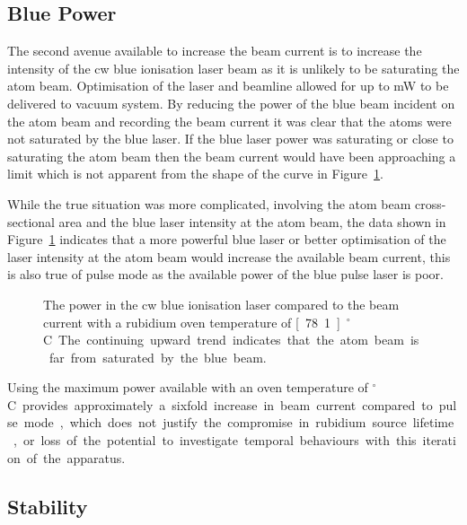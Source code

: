 \subsection{Blue Power}

The second avenue available to increase the beam current is to increase the intensity of the \gls{cw} blue ionisation laser beam as it is unlikely to be saturating the atom beam.
Optimisation of the laser and beamline allowed for up to \unit[280]{mW} to be delivered to vacuum system.
By reducing the power of the blue beam incident on the atom beam and recording the beam current it was clear that the atoms were not saturated by the blue laser.
If the blue laser power was saturating or close to saturating the atom beam then the beam current would have been approaching a limit which is not apparent from the shape of the curve in Figure~\ref{figure:blue_power}.

While the true situation was more complicated, involving the atom beam cross-sectional area and the blue laser intensity at the atom beam, the data shown in Figure~\ref{figure:blue_power} indicates that a more powerful blue laser or better optimisation of the laser intensity at the atom beam would increase the available beam current, this is also true of pulse mode as the available power of the blue pulse laser is poor.

\begin{figure}
    \center
    
    \caption[Beam current and ionisation laser power.]{The power in the \gls{cw} blue ionisation laser compared to the beam current with a rubidium oven temperature of \unit[78.1]{$^\circ$C}.
    The continuing upward trend indicates that the atom beam is far from saturated by the blue beam.}
    \label{figure:blue_power}
\end{figure}

Using the maximum power available with an oven temperature of \unit[200]{$^\circ$C} provides approximately a sixfold increase in beam current compared to pulse mode, which does not justify the compromise in rubidium source lifetime, or loss of the potential to investigate temporal behaviours with this iteration of the apparatus.

\subsection{Stability}\label{section:stability}

